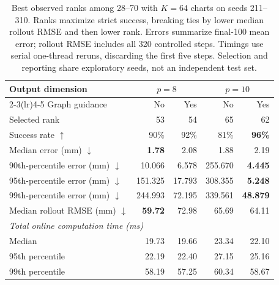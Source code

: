 \begin{table}[htbp]
    \centering
    \small
    \begin{tabular}{lrrrr}
        \toprule
        Output dimension & \multicolumn{2}{c}{$p=8$} & \multicolumn{2}{c}{$p=10$} \\
        \cmidrule(lr){2-3}\cmidrule(lr){4-5}
        Graph guidance & No & Yes & No & Yes \\
        \midrule
        Selected rank & 53 & 54 & 65 & 62 \\
        Success rate $\uparrow$ & 90\% & 92\% & 81\% & \textbf{96\%} \\
        Median error (mm) $\downarrow$ & \textbf{1.78} & 2.08 & 1.88 & 2.19 \\
        90th-percentile error (mm) $\downarrow$ & 10.066 & 6.578 & 255.670 & \textbf{4.445} \\
        95th-percentile error (mm) $\downarrow$ & 151.325 & 17.793 & 308.355 & \textbf{5.248} \\
        99th-percentile error (mm) $\downarrow$ & 244.993 & 72.195 & 339.561 & \textbf{48.879} \\
        Median rollout RMSE (mm) $\downarrow$ & \textbf{59.72} & 72.98 & 65.69 & 64.11 \\
        \midrule
        \multicolumn{5}{l}{\textit{Total online computation time (ms)}} \\
        Median & 19.73 & 19.66 & 23.34 & 22.10 \\
        95th percentile & 22.19 & 22.40 & 27.15 & 25.16 \\
        99th percentile & 58.19 & 57.25 & 60.34 & 58.67 \\
        \bottomrule
    \end{tabular}
    \caption{Best observed ranks among 28--70 with $K=64$ charts on seeds 211--310. Ranks maximize strict success, breaking ties by lower median rollout RMSE and then lower rank. Errors summarize final-100 mean error; rollout RMSE includes all 320 controlled steps. Timings use serial one-thread reruns, discarding the first five steps. Selection and reporting share exploratory seeds, not an independent test set.}
    \label{tab:best-ranks-k64}
\end{table}
